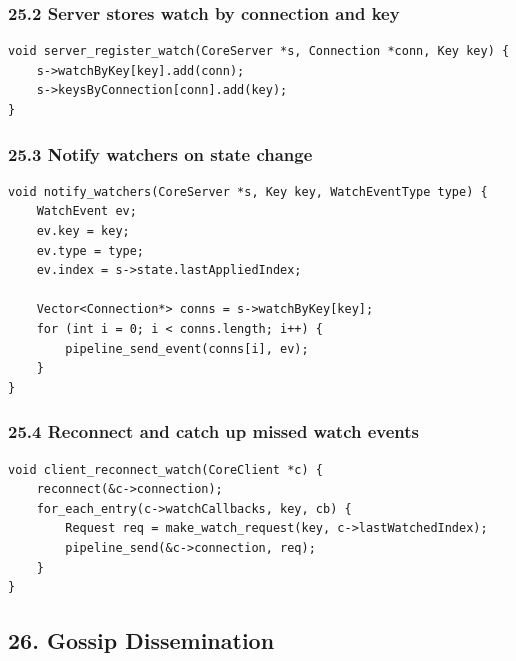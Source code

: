 \documentclass[10pt,letterpaper]{article}
\begin{document}
\subsubsection*{25.2 Server stores watch by connection and key}

\begin{verbatim}
void server_register_watch(CoreServer *s, Connection *conn, Key key) {
    s->watchByKey[key].add(conn);
    s->keysByConnection[conn].add(key);
}
\end{verbatim}

\subsubsection*{25.3 Notify watchers on state change}

\begin{verbatim}
void notify_watchers(CoreServer *s, Key key, WatchEventType type) {
    WatchEvent ev;
    ev.key = key;
    ev.type = type;
    ev.index = s->state.lastAppliedIndex;

    Vector<Connection*> conns = s->watchByKey[key];
    for (int i = 0; i < conns.length; i++) {
        pipeline_send_event(conns[i], ev);
    }
}
\end{verbatim}

\subsubsection*{25.4 Reconnect and catch up missed watch events}

\begin{verbatim}
void client_reconnect_watch(CoreClient *c) {
    reconnect(&c->connection);
    for_each_entry(c->watchCallbacks, key, cb) {
        Request req = make_watch_request(key, c->lastWatchedIndex);
        pipeline_send(&c->connection, req);
    }
}
\end{verbatim}

\subsection*{26. Gossip Dissemination}
\end{document}
